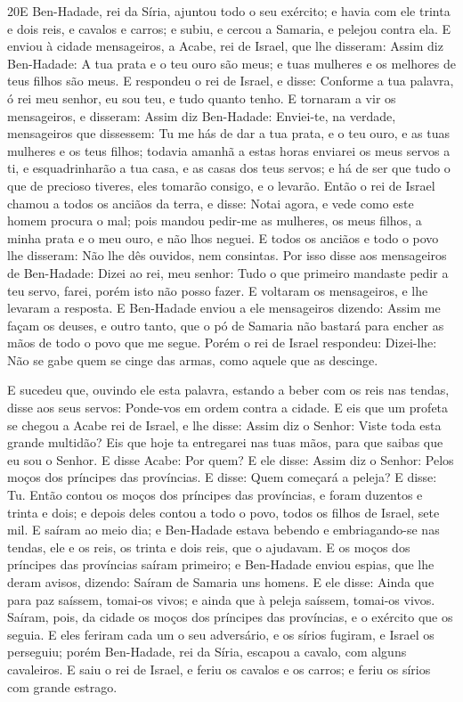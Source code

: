 \medskip

\lettrine{20} E Ben-Hadade, rei da Síria, ajuntou todo o seu
exército; e havia com ele trinta e dois reis, e cavalos e carros; e
subiu, e cercou a Samaria, e pelejou contra ela. E enviou à
cidade mensageiros, a Acabe, rei de Israel, que lhe disseram:
Assim diz Ben-Hadade: A tua prata e o teu ouro são meus; e tuas
mulheres e os melhores de teus filhos são meus. E respondeu o
rei de Israel, e disse: Conforme a tua palavra, ó rei meu senhor, eu
sou teu, e tudo quanto tenho. E tornaram a vir os mensageiros, e
disseram: Assim diz Ben-Hadade: Enviei-te, na verdade, mensageiros
que dissessem: Tu me hás de dar a tua prata, e o teu ouro, e as tuas
mulheres e os teus filhos; todavia amanhã a estas horas enviarei
os meus servos a ti, e esquadrinharão a tua casa, e as casas dos
teus servos; e há de ser que tudo o que de precioso tiveres, eles
tomarão consigo, e o levarão. Então o rei de Israel chamou a
todos os anciãos da terra, e disse: Notai agora, e vede como este
homem procura o mal; pois mandou pedir-me as mulheres, os meus
filhos, a minha prata e o meu ouro, e não lhos neguei. E todos
os anciãos e todo o povo lhe disseram: Não lhe dês ouvidos, nem
consintas. Por isso disse aos mensageiros de Ben-Hadade: Dizei
ao rei, meu senhor: Tudo o que primeiro mandaste pedir a teu servo,
farei, porém isto não posso fazer. E voltaram os mensageiros, e lhe
levaram a resposta. E Ben-Hadade enviou a ele mensageiros
dizendo: Assim me façam os deuses, e outro tanto, que o pó de
Samaria não bastará para encher as mãos de todo o povo que me segue.
Porém o rei de Israel respondeu: Dizei-lhe: Não se gabe quem
se cinge das armas, como aquele que as descinge.

E sucedeu que, ouvindo ele esta palavra, estando a beber com os
reis nas tendas, disse aos seus servos: Ponde-vos em ordem contra a
cidade. E eis que um profeta se chegou a Acabe rei de Israel,
e lhe disse: Assim diz o Senhor: Viste toda esta grande multidão?
Eis que hoje ta entregarei nas tuas mãos, para que saibas que eu sou
o Senhor. E disse Acabe: Por quem? E ele disse: Assim diz o
Senhor: Pelos moços dos príncipes das províncias. E disse: Quem
começará a peleja? E disse: Tu. Então contou os moços dos
príncipes das províncias, e foram duzentos e trinta e dois; e depois
deles contou a todo o povo, todos os filhos de Israel, sete mil.
E saíram ao meio dia; e Ben-Hadade estava bebendo e
embriagando-se nas tendas, ele e os reis, os trinta e dois reis, que
o ajudavam. E os moços dos príncipes das províncias saíram
primeiro; e Ben-Hadade enviou espias, que lhe deram avisos, dizendo:
Saíram de Samaria uns homens. E ele disse: Ainda que para paz
saíssem, tomai-os vivos; e ainda que à peleja saíssem, tomai-os
vivos.
 Saíram, pois, da cidade os moços dos príncipes das províncias, e
o exército que os seguia. E eles feriram cada um o seu
adversário, e os sírios fugiram, e Israel os perseguiu; porém
Ben-Hadade, rei da Síria, escapou a cavalo, com alguns cavaleiros.
E saiu o rei de Israel, e feriu os cavalos e os carros; e
feriu os sírios com grande estrago.

